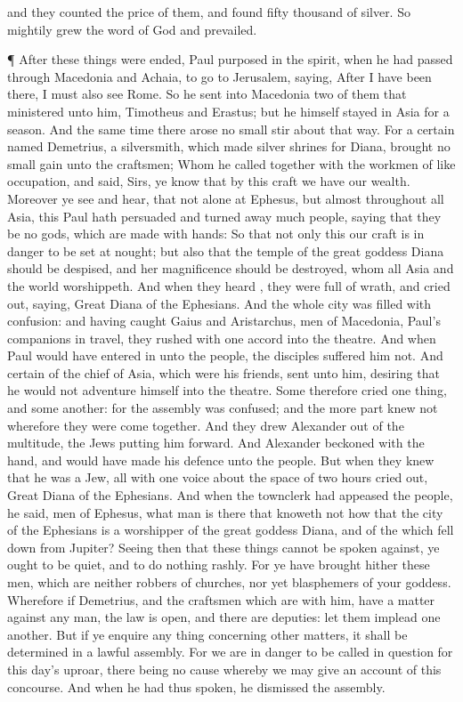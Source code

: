 {and they
counted the
price of
them,
and
found
{}
fifty
thousand
{} of
silver.
So
mightily
grew the
word of
God
and
prevailed.
\par }{\PP {}¶
After these
things were
ended,
Paul
purposed
in the
spirit, when he had passed
through
Macedonia
and
Achaia, to
go
to
Jerusalem,
saying,
After
I have
been
there,
I
must
also
see
Rome.
So he
sent
into
Macedonia
two of
them that
ministered unto
him,
Timotheus
and
Erastus; but
he
himself
stayed
in
Asia for a
season.
And the
same
time there
arose
no
small
stir
about that
way.
For a
certain
{}
named
Demetrius, a
silversmith, which
made
silver
shrines for
Diana,
brought
no
small
gain unto the
craftsmen;
Whom he called
together
with the
workmen
of like
occupation, and
said,
Sirs, ye
know
that
by
this
craft we
have
our
wealth.
Moreover ye
see
and
hear,
that
not
alone at
Ephesus,
but
almost
throughout
all
Asia,
this
Paul hath
persuaded and turned
away
much
people,
saying
that they
be
no
gods,
which are
made with
hands:
So
that
not
only
this
our
craft is in
danger
to be
set at
nought;
but
also that
the
temple of the
great
goddess
Diana should
be
despised,
and
her
magnificence should be
destroyed,
whom
all
Asia
and the
world
worshippeth.
And when they
heard
{}, they
were
full of
wrath,
and cried
out,
saying,
Great
{}
Diana of the
Ephesians.
And the
whole
city was
filled with
confusion:
and having
caught
Gaius
and
Aristarchus, men of
Macedonia,
Paul’s companions in
travel, they
rushed with one
accord
into the
theatre.
And when
Paul
would have entered
in
unto the
people, the
disciples
suffered
him
not.
And
certain of the chief of
Asia, which
were
his
friends,
sent
unto
him,
desiring
{} that he
would
not adventure
himself
into the
theatre.
Some
therefore cried one
thing,
and
some
another:
for the
assembly
was
confused;
and the more
part
knew
not
wherefore they were come
together.
And they
drew
Alexander out
of the
multitude, the
Jews
putting
him
forward.
And
Alexander
beckoned with the
hand, and would
have made his
defence unto the
people.
But when they
knew
that he
was a
Jew,
all
with
one
voice about the
space
of
two
hours cried
out,
Great
{}
Diana of the
Ephesians.
And when the
townclerk had
appeased the
people, he
said,
{}
men of
Ephesus,
what
man is
there
that
knoweth
not how that the
city of the
Ephesians
is a
worshipper of the
great
goddess
Diana,
and of
the
{} which fell down from
Jupiter?
Seeing then
that these
things cannot be spoken
against,
ye
ought to
be
quiet,
and to
do
nothing
rashly.
For ye have brought
hither
these
men, which
are
neither robbers of
churches, nor
yet
blasphemers of
your
goddess.
Wherefore
if
Demetrius,
and the
craftsmen which
are
with
him,
have a
matter
against any
man, the
law is
open,
and there
are
deputies: let them
implead one
another.
But
if ye
enquire any
thing
concerning other
matters, it shall be
determined
in a
lawful
assembly.
For we are in
danger to be called in
question
for this
day’s
uproar, there
being
no cause
whereby we
may
give an
account
of
this
concourse.
And when he
had
thus
spoken, he
dismissed the
assembly.

}
